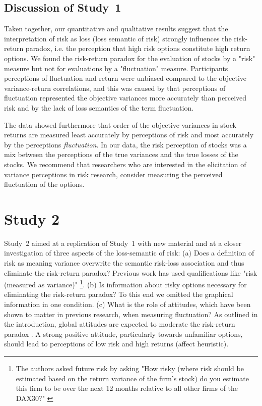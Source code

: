 \documentclass[a4paper,man, natbib,floatsintext]{apa6} %
\begin{document}
\subsection{Discussion of Study~1}
Taken together, our quantitative and qualitative results suggest that the interpretation of risk as loss (loss semantic of risk) strongly influences the risk-return paradox, i.e. the perception that high risk options constitute high return options. We found the risk-return paradox for the evaluation of stocks by a "risk" measure but not for evaluations by a "fluctuation" measure. Participants perceptions of fluctuation and return were unbiased compared to the objective variance-return correlations, and this was caused by that perceptions of fluctuation represented the objective variances more accurately than perceived risk and by the lack of loss semantics of the term fluctuation.

The data showed furthermore that order of the objective variances in stock returns are measured least accurately by perceptions of risk and most accurately by the perceptions \textit{fluctuation}. In our data, the risk perception of stocks was a mix between the perceptions of the true variances and the true losses of the stocks. We recommend that researchers who are interested in the elicitation of variance perceptions in risk research, consider measuring the perceived fluctuation of the options.




\section{Study 2}
Study~2 aimed at a replication of Study~1 with new material and at a closer investigation of three aspects of the loss-semantic of risk: (a) Does a definition of risk as meaning variance overwrite the semantic risk-loss association and thus eliminate the risk-return paradox? Previous work has used qualifications like "risk (measured as variance)" \citep[e.g.,][]{Kempf2014a}\footnote{The authors asked future risk by asking "How risky (where risk should be estimated based on the return variance of the firm’s stock) do you estimate this firm to be over the next 12 months relative to all other firms of the DAX30?" \citep[][p. 1007]{Kempf2014}}. (b) Is information about risky options necessary for eliminating the risk-return paradox? To this end we omitted the graphical information in one condition. (c) What is the role of attitudes, which have been shown to matter in previous research, when measuring fluctuation? As outlined in the introduction, global attitudes are expected to moderate the risk-return paradox \citep[][]{Finucane2000}. A strong positive attitude, particularly towards unfamiliar options, should lead to perceptions of low risk and high returns (affect heuristic).
\end{document}
